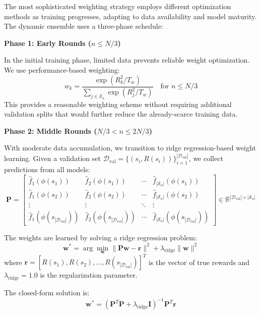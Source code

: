 \documentclass[conference]{IEEEtran}
\begin{document}
The most sophisticated weighting strategy employs different optimization methods as training progresses, adapting to data availability and model maturity. The dynamic ensemble uses a three-phase schedule:

\textbf{Phase 1: Early Rounds ($n \leq N/3$)}

In the initial training phase, limited data prevents reliable weight optimization. We use performance-based weighting:
\begin{equation}
w_k = \frac{\exp(R^2_k / T_w)}{\sum_{j \in \mathcal{S}_n} \exp(R^2_j / T_w)} \quad \text{for } n \leq N/3
\end{equation}
This provides a reasonable weighting scheme without requiring additional validation splits that would further reduce the already-scarce training data.

\textbf{Phase 2: Middle Rounds ($N/3 < n \leq 2N/3$)}

With moderate data accumulation, we transition to ridge regression-based weight learning. Given a validation set $\mathcal{D}_{\text{val}} = \{(s_i, R(s_i))\}_{i=1}^{|\mathcal{D}_{\text{val}}|}$, we collect predictions from all models:
\begin{equation}
\mathbf{P} = \begin{bmatrix}
\hat{f}_1(\phi(s_1)) & \hat{f}_2(\phi(s_1)) & \cdots & \hat{f}_{|\mathcal{S}_n|}(\phi(s_1)) \\
\hat{f}_1(\phi(s_2)) & \hat{f}_2(\phi(s_2)) & \cdots & \hat{f}_{|\mathcal{S}_n|}(\phi(s_2)) \\
\vdots & \vdots & \ddots & \vdots \\
\hat{f}_1(\phi(s_{|\mathcal{D}_{\text{val}}|})) & \hat{f}_2(\phi(s_{|\mathcal{D}_{\text{val}}|})) & \cdots & \hat{f}_{|\mathcal{S}_n|}(\phi(s_{|\mathcal{D}_{\text{val}}|}))
\end{bmatrix} \in \mathbb{R}^{|\mathcal{D}_{\text{val}}| \times |\mathcal{S}_n|}
\end{equation}

The weights are learned by solving a ridge regression problem:
\begin{equation}
\mathbf{w}^* = \arg\min_{\mathbf{w}} \|\mathbf{P}\mathbf{w} - \mathbf{r}\|^2 + \lambda_{\text{ridge}} \|\mathbf{w}\|^2
\end{equation}
where $\mathbf{r} = [R(s_1), R(s_2), \ldots, R(s_{|\mathcal{D}_{\text{val}}|})]^T$ is the vector of true rewards and $\lambda_{\text{ridge}} = 1.0$ is the regularization parameter.

The closed-form solution is:
\begin{equation}
\mathbf{w}^* = (\mathbf{P}^T\mathbf{P} + \lambda_{\text{ridge}}\mathbf{I})^{-1}\mathbf{P}^T\mathbf{r}
\end{equation}
\end{document}
